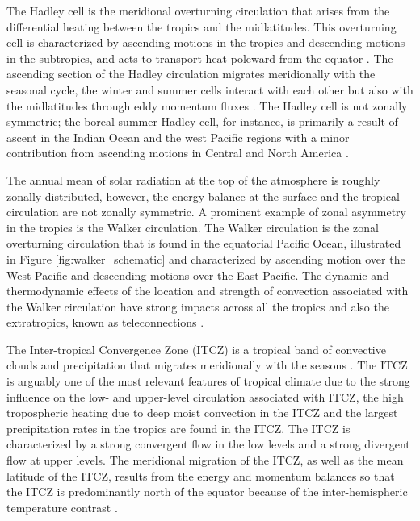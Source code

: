  
The Hadley cell is the meridional overturning circulation that arises from the differential heating between the tropics and the midlatitudes. This overturning cell is characterized by ascending motions in the tropics and descending motions in the subtropics, and acts to transport heat poleward from the equator \citep{lorenz1967}.  The ascending section of the Hadley circulation migrates meridionally with the seasonal cycle, the winter and summer cells interact with each other but also with the midlatitudes through eddy momentum fluxes \citep{bordoni2008monsoons}. 
The Hadley cell is not zonally symmetric; the boreal summer Hadley cell, for instance,  is primarily a result of ascent in the Indian Ocean and the west Pacific regions with a minor contribution from ascending motions in Central and North America \citep{hoskins2020}. 

The annual mean of solar radiation at the top of the atmosphere is roughly zonally distributed, however, the energy balance at the surface and the tropical circulation are not zonally symmetric. A prominent example of zonal asymmetry in the tropics is the Walker circulation. 
The Walker circulation is the zonal overturning circulation that is found in the equatorial Pacific Ocean, illustrated in Figure \ref{fig:walker_schematic} and characterized by ascending motion over the West Pacific and descending motions over the East Pacific\citep{walker1924,bjerknes1969,gill1980}. The dynamic and thermodynamic effects of the location and strength of convection associated with the Walker circulation have strong impacts across all the tropics and also the extratropics, known as teleconnections \citep{cai2019pantropical}.


The Inter-tropical Convergence Zone (ITCZ) is a tropical band of convective clouds and precipitation that migrates meridionally with the seasons \citep{schneider2014}. The ITCZ is arguably one of the most relevant features of tropical climate due to the strong influence on the low- and upper-level circulation associated with ITCZ, the high tropospheric heating due to deep moist convection in the ITCZ and the largest precipitation rates in the tropics are found in the ITCZ.
The ITCZ is characterized by a strong convergent flow in the low levels and a strong divergent flow at upper levels. 
The meridional migration of the ITCZ, as well as the mean latitude of the ITCZ, results from the energy and momentum balances so that the ITCZ is predominantly north of the equator because of the inter-hemispheric temperature contrast \citep{donohoe2013,bischoff2016}.



